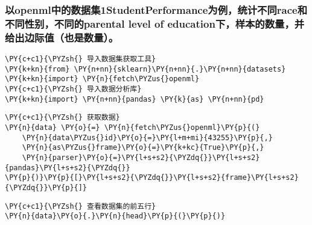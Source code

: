     \hypertarget{ux4ee5openmlux4e2dux7684ux6570ux636eux96c61studentperformanceux4e3aux4f8bux7edfux8ba1ux4e0dux540craceux548cux4e0dux540cux6027ux522bux4e0dux540cux7684parental-level-of-educationux4e0bux6837ux672cux7684ux6570ux91cfux5e76ux7ed9ux51faux8fb9ux9645ux503cux4e5fux662fux6570ux91cf}{%
\subsubsection{以openml中的数据集1StudentPerformance为例，统计不同race和不同性别，不同的parental
level of
education下，样本的数量，并给出边际值（也是数量）。}\label{ux4ee5openmlux4e2dux7684ux6570ux636eux96c61studentperformanceux4e3aux4f8bux7edfux8ba1ux4e0dux540craceux548cux4e0dux540cux6027ux522bux4e0dux540cux7684parental-level-of-educationux4e0bux6837ux672cux7684ux6570ux91cfux5e76ux7ed9ux51faux8fb9ux9645ux503cux4e5fux662fux6570ux91cf}}

    \begin{tcolorbox}[breakable, size=fbox, boxrule=1pt, pad at break*=1mm,colback=cellbackground, colframe=cellborder]
\begin{Verbatim}[commandchars=\\\{\}]
\PY{c+c1}{\PYZsh{} 导入数据集获取工具}
\PY{k+kn}{from} \PY{n+nn}{sklearn}\PY{n+nn}{.}\PY{n+nn}{datasets} \PY{k+kn}{import} \PY{n}{fetch\PYZus{}openml}
\PY{c+c1}{\PYZsh{} 导入数据分析库}
\PY{k+kn}{import} \PY{n+nn}{pandas} \PY{k}{as} \PY{n+nn}{pd}
\end{Verbatim}
\end{tcolorbox}

    \begin{tcolorbox}[breakable, size=fbox, boxrule=1pt, pad at break*=1mm,colback=cellbackground, colframe=cellborder]
\begin{Verbatim}[commandchars=\\\{\}]
\PY{c+c1}{\PYZsh{} 获取数据}
\PY{n}{data} \PY{o}{=} \PY{n}{fetch\PYZus{}openml}\PY{p}{(}
    \PY{n}{data\PYZus{}id}\PY{o}{=}\PY{l+m+mi}{43255}\PY{p}{,}
    \PY{n}{as\PYZus{}frame}\PY{o}{=}\PY{k+kc}{True}\PY{p}{,}
    \PY{n}{parser}\PY{o}{=}\PY{l+s+s2}{\PYZdq{}}\PY{l+s+s2}{pandas}\PY{l+s+s2}{\PYZdq{}}
\PY{p}{)}\PY{p}{[}\PY{l+s+s2}{\PYZdq{}}\PY{l+s+s2}{frame}\PY{l+s+s2}{\PYZdq{}}\PY{p}{]}
\end{Verbatim}
\end{tcolorbox}

    \begin{tcolorbox}[breakable, size=fbox, boxrule=1pt, pad at break*=1mm,colback=cellbackground, colframe=cellborder]
\begin{Verbatim}[commandchars=\\\{\}]
\PY{c+c1}{\PYZsh{} 查看数据集的前五行}
\PY{n}{data}\PY{o}{.}\PY{n}{head}\PY{p}{(}\PY{p}{)}
\end{Verbatim}
\end{tcolorbox}

